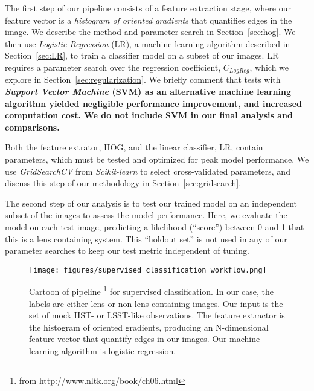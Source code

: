 \documentclass{emulateapj}
\newcommand{\todo}[1]{{\bf\color{blue} #1}}
\begin{document}
The first step of our pipeline consists of a feature extraction stage,
where our feature vector is a {\em histogram of oriented gradients}
\citep{dalalandtriggs_05} that quantifies edges in the image.  We
describe the method and parameter search in Section~\ref{sec:hog}.  We
then use {\em Logistic Regression} (LR), a machine learning algorithm
described in Section~\ref{sec:LR}, to train a classifier model on a
subset of our images.  LR requires a parameter search over the
regression coefficient, $C_{LogReg}$, which we explore in
Section~\ref{sec:regularization}.  We briefly comment that tests with
\todo{{\em Support Vector Machine} (SVM) as an alternative machine
  learning algorithm yielded negligible performance improvement, and
  increased computation cost.  We do not include SVM in our final
  analysis and comparisons.}

Both the feature extrator, HOG, and the linear classifier, LR, contain
parameters, which must be tested and optimized for peak model
performance.  We use {\em GridSearchCV} from {\em Scikit-learn} to
select cross-validated parameters, and discuss this step of our
methodology in Section~\ref{sec:gridsearch}.

The second step of our analysis is to test our trained model on an
independent subset of the images to assess the model performance.
Here, we evaluate the model on each test image, predicting a
likelihood (``score'') between 0 and 1 that this is a lens containing
system.  This ``holdout set'' is not used in any of our parameter
searches to keep our test metric independent of tuning.

\begin{figure}[t]\label{fig:pipeline}
\begin{center}
\texttt{[image: figures/supervised\_classification\_workflow.png]}
\caption{Cartoon of pipeline \footnote{from
    http://www.nltk.org/book/ch06.html} for supervised classification.
  In our case, the labels are either lens or non-lens containing
  images.  Our input is the set of mock HST- or LSST-like
  observations.  The feature extractor is the histogram of oriented
  gradients, producing an N-dimensional feature vector that quantify
  edges in our images.  Our machine learning algorithm is logistic
  regression.}
\end{center}
\end{figure}
\end{document}

